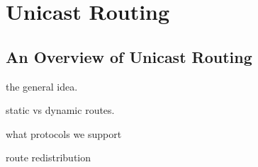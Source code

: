 \chapter{Unicast Routing}

\section{An Overview of Unicast Routing}

the general idea.

static vs dynamic routes.

what protocols we support

route redistribution